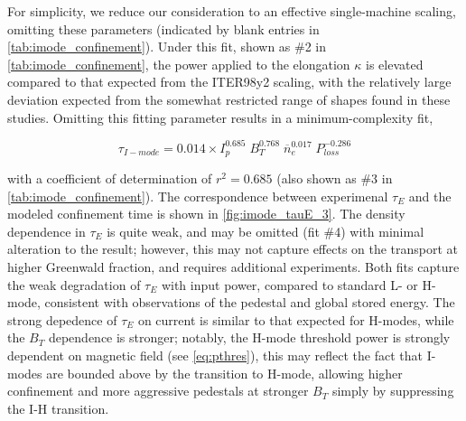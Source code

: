 For simplicity, we reduce our consideration to an effective single-machine scaling, omitting these parameters (indicated by blank entries in \cref{tab:imode_confinement}).  Under this fit, shown as \#2 in \cref{tab:imode_confinement}, the power applied to the elongation $\kappa$ is elevated compared to that expected from the ITER98y2 scaling, with the relatively large deviation expected from the somewhat restricted range of shapes found in these studies.  Omitting this fitting parameter results in a minimum-complexity fit,

\begin{equation}\label{eq:tauE_fit_3}
 \tau_{I-mode} = 0.014 \times I_p^{0.685} \; B_T^{0.768} \; \overline{n}_e^{0.017} \; P_{loss}^{-0.286}
\end{equation}

\noindent with a coefficient of determination of $r^2 = 0.685$ (also shown as \#3 in \cref{tab:imode_confinement}).  The correspondence between experimenal $\tau_E$ and the modeled confinement time is shown in \cref{fig:imode_tauE_3}.  The density dependence in $\tau_E$ is quite weak, and may be omitted (fit \#4) with minimal alteration to the result; however, this may not capture effects on the transport at higher Greenwald fraction, and requires additional experiments.  Both fits capture the weak degradation of $\tau_E$ with input power, compared to standard L- or H-mode, consistent with observations of the pedestal and global stored energy.  The strong depedence of $\tau_E$ on current is similar to that expected for H-modes, while the $B_T$ dependence is stronger; notably, the H-mode threshold power is strongly dependent on magnetic field (see \cref{eq:pthres}), this may reflect the fact that I-modes are bounded above by the transition to H-mode, allowing higher confinement and more aggressive pedestals at stronger $B_T$ simply by suppressing the I-H transition.

